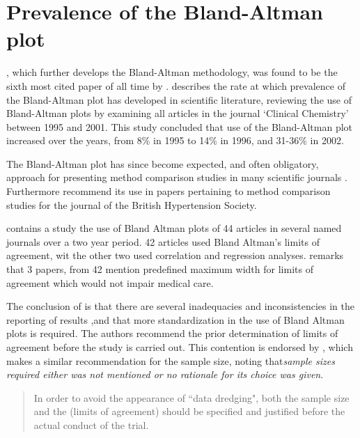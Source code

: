 \documentclass[12pt, a4paper]{report}
\theoremstyle{plain}
\theoremstyle{definition}
\theoremstyle{remark}
\begin{document}
\section{Prevalence of the Bland-Altman plot}

\citet*{BA86}, which further develops the Bland-Altman methodology,
was found to be the sixth most cited paper of all time by \citet{BAcite}. \cite{Dewitte} describes the rate at which
prevalence of the Bland-Altman plot has developed in scientific
literature, reviewing the use of Bland-Altman plots
by examining all articles in the journal `Clinical Chemistry'
between 1995 and 2001. This study concluded that use of the
Bland-Altman plot increased over the years, from 8\% in 1995 to
14\% in 1996, and 31-36\% in 2002.

The Bland-Altman plot has since become expected, and
often obligatory, approach for presenting method comparison
studies in many scientific journals \citep{hollis}. Furthermore
\citet{BritHypSoc} recommend its use in papers pertaining to
method comparison studies for the journal of the British
Hypertension Society.


\citet{mantha} contains a study the use of Bland Altman plots of
44 articles in several named journals over a two year period. 42
articles used Bland Altman's limits of agreement, wit the other
two used correlation and regression analyses. \citet{mantha}
remarks that 3 papers, from 42 mention predefined maximum width
for limits of agreement which would not impair medical care.

The conclusion of \citet{mantha} is that there are several
inadequacies and inconsistencies in the reporting of results ,and
that more standardization in the use of Bland Altman plots is
required. The authors recommend the prior determination of limits
of agreement before the study is carried out. This contention is
endorsed by \citet{lin}, which makes a similar recommendation for
the sample size, noting that\emph{sample sizes required either was
	not mentioned or no rationale for its choice was given}.

\begin{quote}
	In order to avoid the appearance of ``data dredging", both the
	sample size and the (limits of agreement) should be specified and
	justified before the actual conduct of the trial. \citep{lin}
\end{quote}
\end{document}
